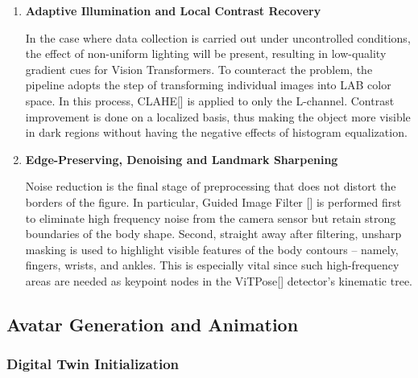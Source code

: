 \documentclass[12pt, a4paper, oneside]{report}
\begin{document}
\begin{enumerate}
\begin{enumerate}
        An ego-motion correction step has been added to avoid motion blur due to camera motion. It uses the optical flow algorithm known as Lucas-Kanade method[\cite{lucas1981iterative}] for identifying features in the background and estimating the affine transformation matrix, which mathematically cancels out any motion done by the camera. After stabilization, a maximum pooled motion saliency mask is generated to differentiate the human from the background.

        \item \textbf{Adaptive Illumination and Local Contrast Recovery}

        In the case where data collection is carried out under uncontrolled conditions, the effect of non-uniform lighting will be present, resulting in low-quality gradient cues for Vision Transformers. To counteract the problem, the pipeline adopts the step of transforming individual images into LAB color space. In this process, CLAHE[\cite{zuiderveld1994contrast}] is applied to only the L-channel. Contrast improvement is done on a localized basis, thus making the object more visible in dark regions without having the negative effects of histogram equalization.

        \item \textbf{Edge-Preserving, Denoising and Landmark Sharpening}

        Noise reduction is the final stage of preprocessing that does not distort the borders of the figure. In particular, Guided Image Filter [\cite{he2013guided}] is performed first to eliminate high frequency noise from the camera sensor but retain strong boundaries of the body shape. Second, straight away after filtering, unsharp masking is used to highlight visible features of the body contours -- namely, fingers, wrists, and ankles. This is especially vital since such high-frequency areas are needed as keypoint nodes in the ViTPose[\cite{xu2022vitpose}] detector’s kinematic tree.
    \end{enumerate}

\end{enumerate}

\subsection{Avatar Generation and Animation}

\subsubsection{Digital Twin Initialization}
\end{document}
